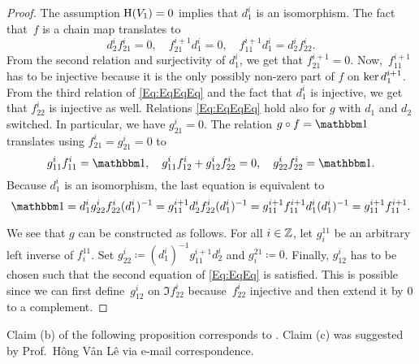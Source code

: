 \documentclass[\MainFolder/Text.tex]{subfiles}
\begin{document}
\begin{proof}
The assumption $\mathrm{H}(V_1)=0$ implies that $d^i_1$ is an isomorphism. The fact that~$f$ is a chain map translates to
\begin{equation}\label{Eq:EqEqEq}
d_2^i f^i_{21} = 0,\quad f^{i+1}_{21} d_1^i = 0,\quad f^{i+1}_{11} d^i_1 = d^i_2 f^i_{22}.
\end{equation}
From the second relation and surjectivity of $d_1^i$, we get that $f_{21}^{i+1} = 0$. Now,~$f^{i+1}_{11}$ has to be injective because it is the only possibly non-zero part of $f$ on $\operatorname{ker} d_1^{i+1}$. From the third relation of \eqref{Eq:EqEqEq} and the fact that $d_1^i$ is injective, we get that $f_{22}^i$ is injective as well.
Relations \eqref{Eq:EqEqEq} hold also for $g$ with $d_1$ and $d_2$ switched. In particular, we have $g_{21}^{i}=0$. The relation $g \circ f = \Id$ translates using $f^i_{21} = g^i_{21} = 0$ to
\begin{equation}\label{Eq:EqEq}
g^i_{11} f^i_{11} = \Id, \quad g^i_{11} f^i_{12} + g^i_{12}f^i_{22}=0, \quad g^i_{22} f^i_{22} = \Id.
\end{equation}
Because $d_1^i$ is an isomorphism, the last equation is equivalent to 
$$ \Id = d_1^i g^i_{22}f^i_{22} (d_1^i)^{-1} = g^{i+1}_{11} d_2^i f^i_{22} (d_1^i)^{-1} = g^{i+1}_{11} f^{i+1}_{11} d_1^i (d_1^i)^{-1} = g^{i+1}_{11} f^{i+1}_{11}. $$

We see that $g$ can be constructed as follows. For all $i\in \mathbb{Z}$, let $g_i^{11}$ be an arbitrary left inverse of $f_i^{11}$. Set $g_{22}^i \coloneqq (d_1^i)^{-1}g_{11}^{i+1} d_2^i$ and $g_i^{21}\coloneqq0$. Finally, $g_{12}^i$ has to be chosen such that the second equation of \eqref{Eq:EqEq} is satisfied. This is possible since we can first define~$g_{12}^i$ on $\Im f^i_{22}$ because~$f^i_{22}$ injective and then extend it by $0$ to a complement.
\end{proof}

Claim (b) of the following proposition corresponds to \cite[Lemma~2.8]{Van2019}. Claim (c) was suggested by Prof.~Hông Vân Lê via e-mail correspondence.
\end{document}
